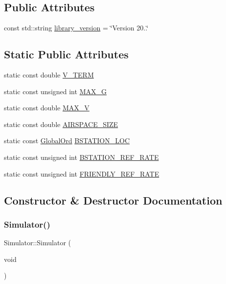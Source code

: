 \subsection*{Public Attributes}
\begin{DoxyCompactItemize}
\item 
const std\+::string \hyperlink{classSimulator_a4eea5ab08ac7b24af87b81d8babad136}{library\+\_\+version} = \char`\"{}Version 20..\char`\"{}
\end{DoxyCompactItemize}
\subsection*{Static Public Attributes}
\begin{DoxyCompactItemize}
\item 
static const double \hyperlink{classSimulator_a8250a5fd76149109333aed2c91fa846e}{V\+\_\+\+T\+E\+RM}
\item 
static const unsigned int \hyperlink{classSimulator_a95d27d8bc5a3dd5a67aeba981128ba4e}{M\+A\+X\+\_\+G}
\item 
static const double \hyperlink{classSimulator_aa4e6371b6605ae050de558167256a9d0}{M\+A\+X\+\_\+V}
\item 
static const double \hyperlink{classSimulator_a5f06c727e635ea9229cb12f662d05036}{A\+I\+R\+S\+P\+A\+C\+E\+\_\+\+S\+I\+ZE}
\item 
static const \hyperlink{structGlobalOrd}{Global\+Ord} \hyperlink{classSimulator_a21f23eb0363ffc0a9cc438e0249f8968}{B\+S\+T\+A\+T\+I\+O\+N\+\_\+\+L\+OC}
\item 
static const unsigned int \hyperlink{classSimulator_a4ecdf564a4773968f2c2acc4f9bad29f}{B\+S\+T\+A\+T\+I\+O\+N\+\_\+\+R\+E\+F\+\_\+\+R\+A\+TE}
\item 
static const unsigned int \hyperlink{classSimulator_a4936b9aff3bee55866a520bf36b4fb5a}{F\+R\+I\+E\+N\+D\+L\+Y\+\_\+\+R\+E\+F\+\_\+\+R\+A\+TE}
\end{DoxyCompactItemize}


\subsection{Constructor \& Destructor Documentation}
\mbox{\label{classSimulator_a62ab66763cb9e6cccbe88d45ab55547f}} 
\subsubsection{\texorpdfstring{Simulator()}{Simulator()}\hspace{0.1cm}{\footnotesize\ttfamily [1/2]}}
{\footnotesize\ttfamily Simulator\+::\+Simulator (\begin{DoxyParamCaption}\item[{void}]{ }\end{DoxyParamCaption})}



